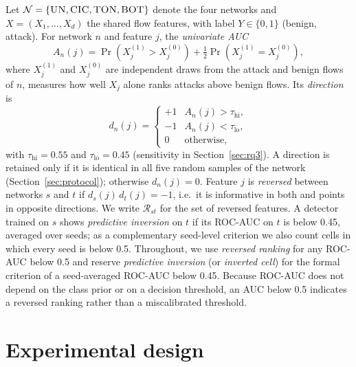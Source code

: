 \documentclass[preprint,12pt]{elsarticle}
\newcommand{\net}[1]{\textsc{#1}}
\begin{document}
Let $\mathcal{N}=\{\net{UN},\net{CIC},\net{TON},\net{BOT}\}$ denote the four networks and $X=(X_1,\dots,X_d)$ the shared flow features, with label $Y\in\{0,1\}$ (benign, attack). For network $n$ and feature $j$, the \emph{univariate AUC}
\begin{equation}
A_n(j) = \Pr\!\left(X_j^{(1)} > X_j^{(0)}\right) + \tfrac{1}{2}\Pr\!\left(X_j^{(1)} = X_j^{(0)}\right),
\end{equation}
where $X_j^{(1)}$ and $X_j^{(0)}$ are independent draws from the attack and benign flows of $n$, measures how well $X_j$ alone ranks attacks above benign flows. Its \emph{direction} is
\begin{equation}
d_n(j) = \begin{cases} +1 & A_n(j) > \tau_{\mathrm{hi}},\\ -1 & A_n(j) < \tau_{\mathrm{lo}},\\ 0 & \text{otherwise,}\end{cases}
\end{equation}
with $\tau_{\mathrm{hi}}=0.55$ and $\tau_{\mathrm{lo}}=0.45$ (sensitivity in Section~\ref{sec:rq3}). A direction is retained only if it is identical in all five random samples of the network (Section~\ref{sec:protocol}); otherwise $d_n(j)=0$. Feature $j$ is \emph{reversed} between networks $s$ and $t$ if $d_s(j)\,d_t(j)=-1$, i.e.\ it is informative in both and points in opposite directions. We write $\mathcal{R}_{st}$ for the set of reversed features. A detector trained on $s$ shows \emph{predictive inversion} on $t$ if its ROC-AUC on $t$ is below 0.45, averaged over seeds; as a complementary seed-level criterion we also count cells in which every seed is below 0.5. Throughout, we use \emph{reversed ranking} for any ROC-AUC below 0.5 and reserve \emph{predictive inversion} (or \emph{inverted cell}) for the formal criterion of a seed-averaged ROC-AUC below 0.45. Because ROC-AUC does not depend on the class prior or on a decision threshold, an AUC below 0.5 indicates a reversed ranking rather than a miscalibrated threshold.

\section{Experimental design}
\label{sec:design}
\end{document}
